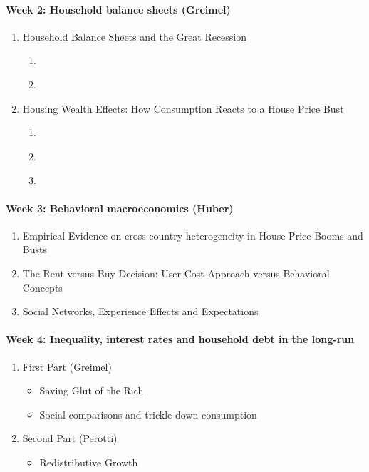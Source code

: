 \documentclass[a4paper,12pt]{article}
\begin{document}
\paragraph{Week 2: Household balance sheets (Greimel)}

\begin{enumerate}
\item Household Balance Sheets and the Great Recession
  \begin{enumerate}
  \item \cite{mian2013household}
  \item \cite{berger2015consumption}
  \end{enumerate}
\item Housing Wealth Effects: How Consumption Reacts to a House Price Bust
  \begin{enumerate}
  \item \cite{berger2018house}
  \item \cite{guren2021housing}
  \item \cite{greimel2019understanding}
  \end{enumerate}
\end{enumerate}

\paragraph{Week 3: Behavioral macroeconomics (Huber)}
\begin{enumerate}
\item Empirical Evidence on cross-country heterogeneity in House Price Booms and Busts \citep{Huber:2019}
\item The Rent versus Buy Decision: User Cost Approach
  versus Behavioral Concepts
  \citep{Huber:2022,Huber:2020}
\item Social Networks, Experience Effects and Expectations 
  \citep{Kuchler:2019, bailey2018housing, Malmendier:2019, kaplan2020housing}
\end{enumerate}


\paragraph{Week 4: Inequality, interest rates and household debt in the long-run}

\begin{enumerate}
  
\item First Part (Greimel)
  \begin{itemize}
  \item Saving Glut of the Rich  \citep{kumhof2015inequality,mian2021indebted-demand}
  \item Social comparisons and trickle-down consumption
    \citep{bertrand2016trickle, bellet2019mcmansion, drechsel2021falling-behind}
  \end{itemize}
  
\item Second Part (Perotti)
  \begin{itemize}
  \item Redistributive Growth \citep{doettling2020secular}
  \end{itemize}
\end{enumerate}
\end{document}
